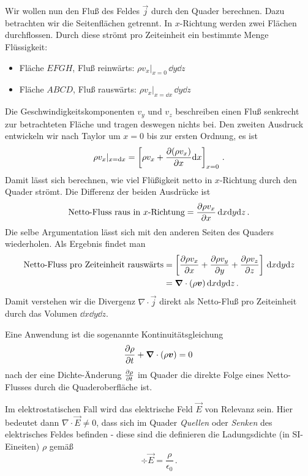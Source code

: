 \documentclass[paper=a4, fontsize=11.0pt, abstractoff, DIV12]{scrartcl}
\begin{document}
Wir wollen nun den Fluß des Feldes $\vec j$ durch den Quader berechnen. Dazu
betrachten wir die Seitenflächen getrennt. In $x$-Richtung werden zwei
Flächen durchflossen. Durch diese strömt pro Zeiteinheit ein bestimmte Menge
Flüssigkeit:
\begin{itemize}
    \item Fläche $EFGH$, Fluß \glqq reinwärts\grqq: $\rho
    v_x\vert_{x=0}\, \dd y \dd z$
    \item Fläche $ABCD$, Fluß \glqq rauswärts\grqq: $\rho v_x\vert_{x=\dd
    x}\, \dd y \dd z$
\end{itemize}
Die Geschwindigkeitskomponenten $v_y$ und $v_z$ beschreiben einen Fluß
senkrecht zur betrachteten Fläche und tragen deswegen nichts bei. Den
zweiten Ausdruck entwickeln wir nach Taylor um $x=0$ bis zur ersten Ordnung,
es ist
\begin{equation*}
\rho v_x\vert_{x=\mathrm{d} x} = \left[\rho v_x + \frac{\partial (\rho v_x)}{\partial x}\mathrm{d} x\right]_{x=0}\, .
\end{equation*}
Damit lässt sich berechnen, wie viel Flüßigkeit netto in $x$-Richtung durch den
Quader strömt. Die Differenz der beiden Ausdrücke ist
\begin{equation}
\text{Netto-Fluss raus in \ensuremath{x}-Richtung} = \frac{\partial \rho v_x}{\partial x}\,\mathrm{d} x\mathrm{d} y\mathrm{d} z\,.
\end{equation}
Die selbe Argumentation lässt sich mit den anderen Seiten des Quaders
wiederholen. Als Ergebnis findet man
\begin{align}
\text{Netto-Fluss pro Zeiteinheit rausw\"arts} &= \left[\firstpderiv{\rho v_x}{x} +  \firstpderiv{\rho v_y}{y} + \firstpderiv{\rho v_z}{z}\right]\, \dd x\dd y \dd z\nonumber\\
&=\nabla\cdot(\rho \vec v) \,\dd x\dd y\dd z\, .
\end{align}
Damit verstehen wir die Divergenz $\nabla \cdot \vec j$ direkt als
Netto-Fluß pro Zeiteinheit durch das Volumen $\dd x\dd y\dd z$.

Eine Anwendung ist die sogenannte Kontinuitätsgleichung
\begin{equation}
\firstpderiv{\rho}{t} + \nabla\cdot(\rho\vec v) = 0\,
\end{equation}
nach der eine Dichte-Änderung $\frac{\partial \rho}{\partial t}$ im Quader die direkte
Folge eines Netto-Flusses durch die Quaderoberfläche ist.

Im elektrostatischen Fall wird das elektrische Feld $\vec E$ von Relevanz
sein. Hier bedeutet dann $\nabla \cdot \vec E \ne 0$, dass sich im Quader
\emph{Quellen} oder \emph{Senken} des elektrisches Feldes befinden - diese sind
die definieren die Ladungsdichte (in SI-Eineiten) $\rho$ gemäß
\begin{equation}
\div \vec E = \frac{\rho}{\epsilon_0}\,.
\end{equation}
\end{document}
